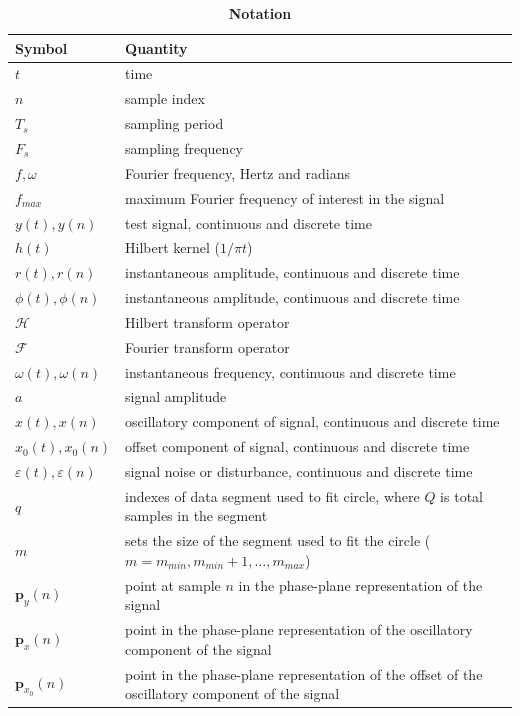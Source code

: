 \documentclass[journal,11pt,a4paper,onecolumn,draftcls]{IEEEtran}
\begin{document}
\begin{table}[!ht]
\caption{
\bf{Notation}}
\begin{tabular}{|l|l|}
	\hline
	\textbf{Symbol} & \textbf{Quantity} \\ \hline
	$t$ & time \\ \hline
	$n$ & sample index \\ \hline
	$T_s$ & sampling period \\ \hline
	$F_s$ & sampling frequency \\ \hline	
	$f,\omega$ & Fourier frequency, Hertz and radians \\ \hline	
	$f_{max}$ & maximum Fourier frequency of interest in the signal \\ \hline
	$y(t),y(n)$ & test signal, continuous and discrete time \\ \hline
	$h(t)$ & Hilbert kernel ($1/\pi t$) \\ \hline
	$r(t), r(n)$ & instantaneous amplitude, continuous and discrete time \\ \hline
	$\phi(t),\phi(n)$ & instantaneous amplitude, continuous and discrete time \\ \hline
	$\mathcal{H}$ & Hilbert transform operator \\ \hline
	$\mathcal{F}$ & Fourier transform operator \\ \hline
	$\omega(t),\omega(n)$ & instantaneous frequency, continuous and discrete time \\ \hline
	$a$ & signal amplitude \\ \hline
	$x(t),x(n)$ & oscillatory component of signal, continuous and discrete time \\ \hline
	$x_0(t),x_0(n)$ & offset component of signal, continuous and discrete time \\ \hline
	$\varepsilon(t),\varepsilon(n)$ & signal noise or disturbance, continuous and discrete time \\ \hline
	$q$ & indexes of data segment used to fit circle, where $Q$ is total samples in the segment  \\ \hline
	$m$ & sets the size of the segment used to fit the circle ($m=m_{min},m_{min}+1,\hdots,m_{max}$) \\ \hline
	$\mathbf{p}_y(n)$ & point at sample $n$ in the phase-plane representation of the signal \\ \hline
	$\mathbf{p}_x(n)$ & point in the phase-plane representation of the oscillatory component of the signal \\ \hline 
	$\mathbf{p}_{x_0}(n)$ & point in the phase-plane representation of the offset of the oscillatory component of the signal \\ \hline  

\end{tabular}
\end{table}
\end{document}
